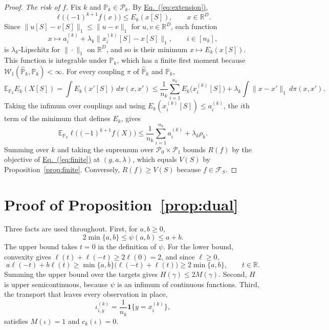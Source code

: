 \documentclass[11pt,a4paper]{article}
\newcommand{\Eqref}[1]{\hyperref[#1]{Eq.~(\ref*{#1})}}
\theoremstyle{plain}
\begin{document}
\begin{proof}
\emph{The risk of $f$.}
Fix $k$ and $\mathbb P_k\in\mathcal P_k$. By \Eqref{eq:extension},
\[
\ell\bigl((-1)^{k+1}f(x)\bigr)\le E_k(x[S]),\qquad x\in\mathbb R^D.
\]
Since $\|u[S]-v[S]\|_1\le\|u-v\|_1$ for $u,v\in\mathbb R^D$, each
function
\[
x\mapsto a_i^{(k)}+\lambda_k\|x_i^{(k)}[S]-x[S]\|_1,\qquad i\in[n_k],
\]
is $\lambda_k$-Lipschitz for $\|\cdot\|_1$ on $\mathbb R^D$, and so is
their minimum $x\mapsto E_k(x[S])$. This function is integrable under $\mathbb P_k$, which has a finite first moment because
$\mathcal W_1(\widehat{\mathbb P}_k,\mathbb P_k)<\infty$. For every
coupling $\pi$ of $\widehat{\mathbb P}_k$ and $\mathbb P_k$,
\[
\mathbb E_{\mathbb P_k}E_k(X[S])
=\int E_k(x'[S])\,d\pi(x,x')
\le\frac1{n_k}\sum_{i=1}^{n_k}E_k\bigl(x_i^{(k)}[S]\bigr)
+\lambda_k\int\|x-x'\|_1\,d\pi(x,x').
\]
Taking the infimum over couplings and using
$E_k(x_i^{(k)}[S])\le a_i^{(k)}$, the $i$th term of the minimum that
defines $E_k$, gives
\[
\mathbb E_{\mathbb P_k}\ell\bigl((-1)^{k+1}f(X)\bigr)
\le\frac1{n_k}\sum_{i=1}^{n_k}a_i^{(k)}+\lambda_k\rho_k.
\]
Summing over $k$ and taking the supremum over
$\mathcal P_0\times\mathcal P_1$ bounds $R(f)$ by the objective of
\Eqref{eq:finite} at $(g,a,\lambda)$, which equals $V(S)$ by
Proposition~\ref{prop:finite}. Conversely, $R(f)\ge V(S)$ because
$f\in\mathcal F_S$.
\end{proof}

\section{Proof of Proposition~\ref{prop:dual}}\label{app:dual}
Three facts are used throughout. First, for $a,b\ge0$,
\begin{equation}\label{eq:psi-bounds}
2\min\{a,b\}\le\psi(a,b)\le a+b.
\end{equation}
The upper bound takes $t=0$ in the definition of $\psi$. For the lower
bound, convexity gives $\ell(t)+\ell(-t)\ge2\ell(0)=2$, and since
$\ell\ge0$,
\[
a\ell(-t)+b\ell(t)\ge\min\{a,b\}\bigl(\ell(-t)+\ell(t)\bigr)
\ge2\min\{a,b\},\qquad t\in\mathbb R.
\]
Summing the upper bound over the targets gives $H(\gamma)\le2M(\gamma)$.
Second, $H$ is upper semicontinuous, because $\psi$ is an infimum of
continuous functions. Third, the transport that leaves every
observation in place,
\[
\iota_{i,y}^{(k)}=\frac1{n_k}\mathbf1\{y=x_i^{(k)}\},
\]
satisfies $M(\iota)=1$ and $c_k(\iota)=0$.
\end{document}
